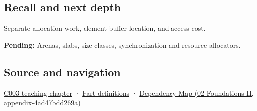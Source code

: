\subsection{Recall and next depth}\label{appendix-c3480f7d9ff3-recall-and-next-depth}

Separate allocation work, element buffer location, and access cost.

\textbf{Pending:} Arenas, slabs, size classes, synchronization and resource allocators.

\subsection{Source and navigation}\label{appendix-c3480f7d9ff3-source-and-navigation}

\hyperref[01-foundations-i-ch002-where-the-bytes-live]{C003 teaching chapter} · \hyperref[appendix-fd090d982a15-m003---parts-41-60]{Part definitions} · \href{../02-Foundations-II/main.pdf\#nameddest=appendix-4ad47bdd269a}{Dependency Map (02-Foundations-II, appendix-4ad47bdd269a)}
